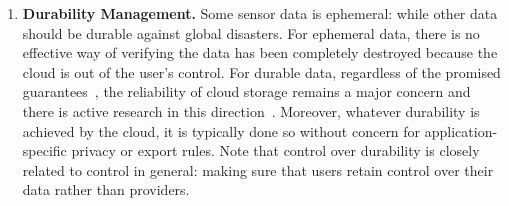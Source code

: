 \begin{enumerate}
\item \textbf{Durability Management.} Some sensor data is ephemeral: while other
  data should be durable against global disasters.  For ephemeral data, there is
  no effective way of verifying the data has been completely destroyed because
  the cloud is out of the user's control. For durable data, regardless of the
  promised guarantees~\cite{s3durability}, the reliability of cloud storage
  remains a major concern and there is active research in this
  direction~\cite{bessani2013depsky}.  Moreover, whatever durability is achieved
  by the cloud, it is typically done so without concern for application-specific
  privacy or export rules.  Note that control over durability is closely related
  to control in general: making sure that users retain control over their data
  rather than providers.

\end{enumerate}

